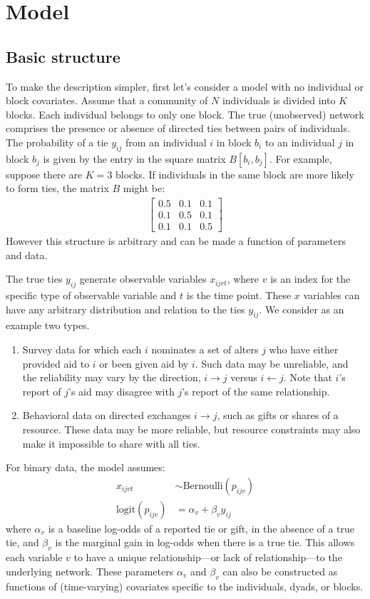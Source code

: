 \documentclass[reqno,12pt,a4paper]{amsart}
\begin{document}
\section{Model}

\subsection{Basic structure}

To make the description simpler, first let's consider a model with no individual or block covariates. Assume that a community of $N$ individuals is divided into $K$ blocks. Each individual belongs to only one block. The true (unobserved) network comprises the presence or absence of directed ties between pairs of individuals. The probability of a tie $y_{ij}$ from an individual $i$ in block $b_i$ to an individual $j$ in block $b_j$ is given by the entry in the square matrix $B[b_i,b_j]$. For example, suppose there are $K=3$ blocks. If individuals in the same block are more likely to form ties, the matrix $B$ might be:
\begin{align*}
\begin{bmatrix}0.5 & 0.1 & 0.1 \\ 0.1 & 0.5 & 0.1 \\ 0.1 & 0.1 & 0.5 \end{bmatrix}
\end{align*}
However this structure is arbitrary and can be made a function of parameters and data.

The true ties $y_{ij}$ generate observable variables $x_{ijvt}$, where $v$ is an index for the specific type of observable variable and $t$ is the time point. These $x$ variables can have any arbitrary distribution and relation to the ties $y_{ij}$. We consider as an example two types.
\begin{enumerate}
\item Survey data for which each $i$ nominates a set of alters $j$ who have either provided aid to $i$ or been given aid by $i$. Such data may be unreliable, and the reliability may vary by the direction, $i \rightarrow j$ versus $i \leftarrow j$. Note that $i$'s report of $j$'s aid may disagree with $j$'s report of the same relationship.
\item Behavioral data on directed exchanges $i \rightarrow j$, such as gifts or shares of a resource. These data may be more reliable, but resource constraints may also make it impossible to share with all ties.
\end{enumerate}
For binary data, the model assumes:
\begin{align*}
	x_{ijvt} &\sim \mathrm{Bernoulli}( p_{ijv} )\\
	\mathrm{logit}(p_{ijv}) &= \alpha_v + \beta_v y_{ij}
\end{align*}
where $\alpha_v$ is a baseline log-odds of a reported tie or gift, in the absence of a true tie, and $\beta_v$ is the marginal gain in log-odds when there is a true tie. This allows each variable $v$ to have a unique relationship---or lack of relationship---to the underlying network. These parameters $\alpha_v$ and $\beta_v$ can also be constructed as functions of (time-varying) covariates specific to the individuals, dyads, or blocks.
\end{document}
